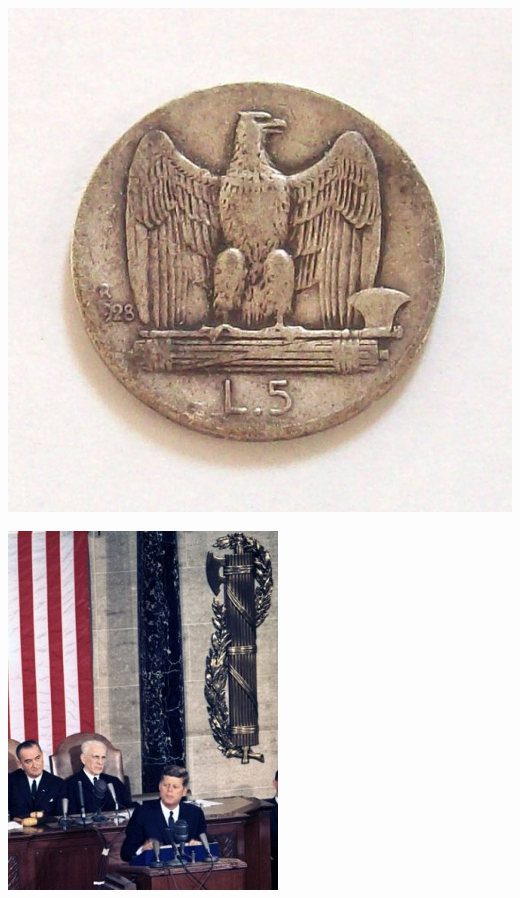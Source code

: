\begin{frame}
    \centering
    \includegraphics[width=.9\textwidth]{img/fasces/italy-fasces-coin.jpg} \\
\end{frame}
\begin{frame}
    \centering
    \includegraphics[width=.9\textwidth]{img/fasces/jfk.jpg} \\
\end{frame}

